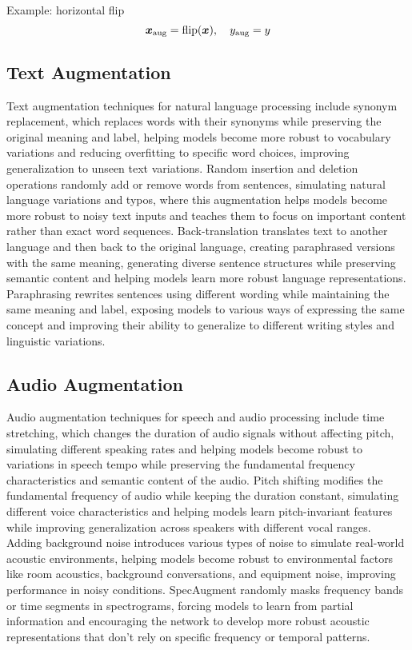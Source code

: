 Example: horizontal flip
\begin{equation}
\boldsymbol{x}_{\text{aug}} = \text{flip}(\boldsymbol{x}), \quad y_{\text{aug}} = y
\end{equation}

\subsection{Text Augmentation}

Text augmentation techniques for natural language processing include synonym replacement, which replaces words with their synonyms while preserving the original meaning and label, helping models become more robust to vocabulary variations and reducing overfitting to specific word choices, improving generalization to unseen text variations. Random insertion and deletion operations randomly add or remove words from sentences, simulating natural language variations and typos, where this augmentation helps models become more robust to noisy text inputs and teaches them to focus on important content rather than exact word sequences. Back-translation translates text to another language and then back to the original language, creating paraphrased versions with the same meaning, generating diverse sentence structures while preserving semantic content and helping models learn more robust language representations. Paraphrasing rewrites sentences using different wording while maintaining the same meaning and label, exposing models to various ways of expressing the same concept and improving their ability to generalize to different writing styles and linguistic variations.

\subsection{Audio Augmentation}

Audio augmentation techniques for speech and audio processing include time stretching, which changes the duration of audio signals without affecting pitch, simulating different speaking rates and helping models become robust to variations in speech tempo while preserving the fundamental frequency characteristics and semantic content of the audio. Pitch shifting modifies the fundamental frequency of audio while keeping the duration constant, simulating different voice characteristics and helping models learn pitch-invariant features while improving generalization across speakers with different vocal ranges. Adding background noise introduces various types of noise to simulate real-world acoustic environments, helping models become robust to environmental factors like room acoustics, background conversations, and equipment noise, improving performance in noisy conditions. SpecAugment randomly masks frequency bands or time segments in spectrograms, forcing models to learn from partial information and encouraging the network to develop more robust acoustic representations that don't rely on specific frequency or temporal patterns.

